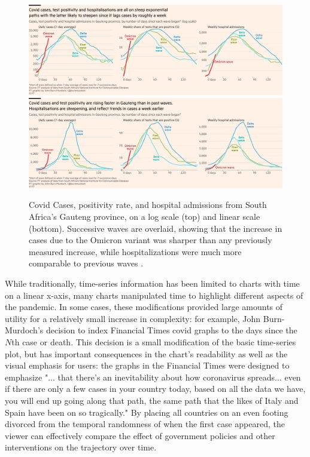 \documentclass[article]{jdssv}\usepackage[]{graphicx}\usepackage[]{xcolor}
\begin{document}
\begin{figure}\centering
\includegraphics[width=\linewidth]{ft-waves}\\
\includegraphics[width=\linewidth]{ft-waves-linear}
\caption{Covid Cases, positivity rate, and hospital admissions from South Africa's Gauteng province, on a log scale (top) and linear scale (bottom). Successive waves are overlaid, showing that the increase in cases due to the Omicron variant was sharper than any previously measured increase, while hospitalizations were much more comparable to previous waves \citep{burn-murdoch_new_2021-1}.}
\label{fig:ft-waves}
\end{figure}

While traditionally, time-series information has been limited to charts with time on a linear x-axis, many charts manipulated time to highlight different aspects of the pandemic. In some cases, these modifications provided large amounts of utility for a relatively small increase in complexity: for example, John Burn-Murdoch's decision to index Financial Times covid graphs to the days since the $N$th case or death. This decision is a small modification of the basic time-series plot, but has important consequences in the chart's readability as well as the visual emphasis for users: the graphs in the Financial Times were designed to emphasize "... that there's an inevitability about how coronavirus spreads... even if there are only a few cases in your country today, based on all the data we have, you will end up going along that path, the same path that the likes of Italy and Spain have been on so tragically."\citep{hannenCoronavirusTrajectoryTracker2020a} By placing all countries on an even footing divorced from the temporal randomness of when the first case appeared, the viewer can effectively compare the effect of government policies and other interventions on the trajectory over time\citep{burn-murdochAllCountriesDeath2020,burn-murdochLatestCaseTrajectories2020}. 
\end{document}
